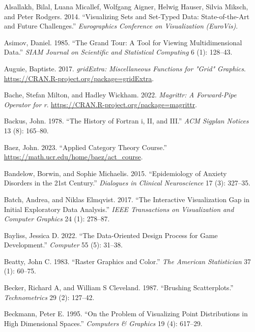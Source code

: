 \documentclass[
  openany]{book}
\newlength{\cslhangindent}
\newenvironment{CSLReferences}[2] %
 {\begin{list}{}{%
  \setlength{\itemindent}{0pt}
  \setlength{\leftmargin}{0pt}
  \setlength{\parsep}{0pt}
  \ifodd #1
   \setlength{\leftmargin}{\cslhangindent}
   \setlength{\itemindent}{-1\cslhangindent}
  \fi
  \setlength{\itemsep}{#2\baselineskip}}}
 {\end{list}}
\theoremstyle{definition}
\theoremstyle{definition}
\theoremstyle{definition}
\theoremstyle{definition}
\theoremstyle{remark}
\begin{document}
\begin{CSLReferences}{1}{0}
Alsallakh, Bilal, Luana Micallef, Wolfgang Aigner, Helwig Hauser, Silvia Miksch, and Peter Rodgers. 2014. {``Visualizing Sets and Set-Typed Data: State-of-the-Art and Future Challenges.''} \emph{Eurographics Conference on Visualization (EuroVis)}.

Asimov, Daniel. 1985. {``The Grand Tour: A Tool for Viewing Multidimensional Data.''} \emph{SIAM Journal on Scientific and Statistical Computing} 6 (1): 128--43.

Auguie, Baptiste. 2017. \emph{gridExtra: Miscellaneous Functions for "Grid" Graphics}. \url{https://CRAN.R-project.org/package=gridExtra}.

Bache, Stefan Milton, and Hadley Wickham. 2022. \emph{Magrittr: A Forward-Pipe Operator for r}. \url{https://CRAN.R-project.org/package=magrittr}.

Backus, John. 1978. {``The History of Fortran i, II, and III.''} \emph{ACM Sigplan Notices} 13 (8): 165--80.

Baez, John. 2023. {``{Applied Category Theory Course}.''} \url{https://math.ucr.edu/home/baez/act_course}.

Bandelow, Borwin, and Sophie Michaelis. 2015. {``Epidemiology of Anxiety Disorders in the 21st Century.''} \emph{Dialogues in Clinical Neuroscience} 17 (3): 327--35.

Batch, Andrea, and Niklas Elmqvist. 2017. {``The Interactive Visualization Gap in Initial Exploratory Data Analysis.''} \emph{IEEE Transactions on Visualization and Computer Graphics} 24 (1): 278--87.

Bayliss, Jessica D. 2022. {``The Data-Oriented Design Process for Game Development.''} \emph{Computer} 55 (5): 31--38.

Beatty, John C. 1983. {``Raster Graphics and Color.''} \emph{The American Statistician} 37 (1): 60--75.

Becker, Richard A, and William S Cleveland. 1987. {``Brushing Scatterplots.''} \emph{Technometrics} 29 (2): 127--42.

Beckmann, Peter E. 1995. {``On the Problem of Visualizing Point Distributions in High Dimensional Spaces.''} \emph{Computers \& Graphics} 19 (4): 617--29.


\end{CSLReferences}
\end{document}

